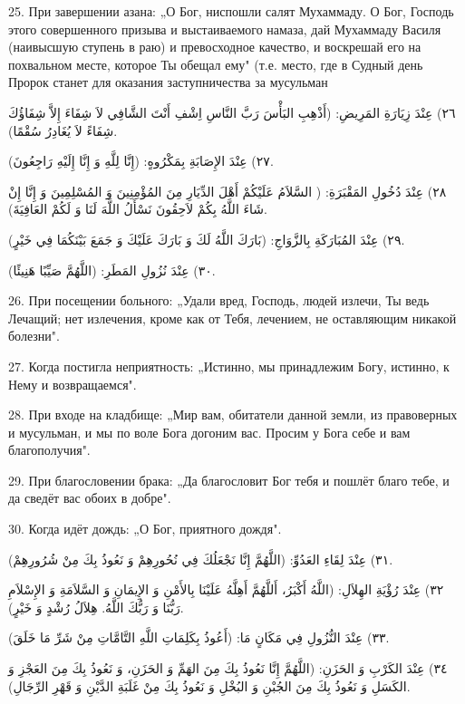 \documentclass[a5paper]{article}
\begin{document}
25. При завершении азана: „О Бог, ниспошли салят Мухаммаду. О Бог, Господь этого совершенного призыва и выстаиваемого намаза, дай Мухаммаду Василя (наивысшую ступень в раю) и превосходное качество, и воскрешай его на похвальном месте, которое Ты обещал ему" (т.е. место, где в Судный день Пророк станет для оказания заступничества за мусульман

٢٦) عِنْدَ زِيَارَةِ المَرِيضِ: (أَذْهِبِ البَأْسَ رَبَّ النَّاسِ اِشْفِ أَنْتَ الشَّافِي لاَ شِفَاءَ إِلاَّ شِفَاؤُكَ شِفَاءً لاَ يُغَادِرُ سُقْمًا).

٢٧) عِنْدَ الإِصَابَةِ بِمَكْرُوهٍ: (إِنَّا لِلَّهِ وَ إِنَّا إِلَيْهِ رَاجِعُونَ).

٢٨) عِنْدَ دُخُولِ المَقْبَرَةِ: ( السَّلاَمُ عَلَيْكُمْ أَهْلَ الدِّيَارِ مِنَ المُؤْمِنِينَ وَ المُسْلِمِينَ وَ إِنَّا إِنْ شَاءَ اللَّهُ بِكُمْ لاَحِقُونَ نَسْأَلُ اللَّهَ لَنَا وَ لَكُمْ العَافِيَةَ).

٢٩) عِنْدَ المُبَارَكَةِ بِالزَّوَاجِ: (بَارَكَ اللَّهُ لَكَ وَ بَارَكَ عَلَيْكَ وَ جَمَعَ بَيْنَكُمَا فِي خَيْرٍ).

٣٠) عِنْدَ نُزُولِ المَطَرِ: (اللَّهُمَّ صَيِّبًا هَنِيئًا).

26. При посещении больного: „Удали вред, Господь, людей излечи, Ты ведь Лечащий; нет излечения, кроме как от Тебя, лечением, не оставляющим никакой болезни".

27. Когда постигла неприятность: „Истинно, мы принадлежим Богу, истинно, к Нему и возвращаемся".

28. При входе на кладбище: „Мир вам, обитатели данной земли, из правоверных и мусульман, и мы по воле Бога догоним вас. Просим у Бога себе и вам благополучия".

29. При благословении брака: „Да благословит Бог тебя и пошлёт благо тебе, и да сведёт вас обоих в добре".

30. Когда идёт дождь: „О Бог, приятного дождя".

٣١) عِنْدَ لِقَاءِ العَدُوِّ: (اللَّهُمَّ إِنَّا نَجْعَلُكَ فِي نُحُورِهِمْ وَ نَعُوذُ بِكَ مِنْ شُرُورِهِمْ).

٣٢) عِنْدَ رُؤْيَةِ الهِلاَلِ: (اللَّهُ أَكْبَرُ، أَللَّهُمَّ أَهِلَّهُ عَلَيْنَا بِالأَمْنِ وَ الإِيمَانِ وَ السَّلاَمَةِ وَ الإِسْلاَمِ رَبُّنَا وَ رَبُّكَ اللَّهُ. هِلاَلُ رُشْدٍ وَ خَيْرٍ).

٣٣) عِنْدَ النُّزُولِ فِي مَكَانٍ مَا: (أَعُوذُ بِكَلِمَاتِ اللَّهِ التَّامَّاتِ مِنْ شَرِّ مَا خَلَقَ).

٣٤) عِنْدَ الكَرْبِ وَ الحَزَنِ: (اللَّهُمَّ إِنَّا نَعُوذُ بِكَ مِنَ الهَمِّ وَ الحَزَنِ، وَ نَعُوذُ بِكَ مِنَ العَجْزِ وَ الكَسَلِ وَ نَعُوذُ بِكَ مِنَ الجُبْنِ وَ البُخْلِ وَ نَعُوذُ بِكَ مِنْ غَلَبَةِ الدَّيْنِ وَ قَهْرِ الرِّجَالِ).
\end{document}
